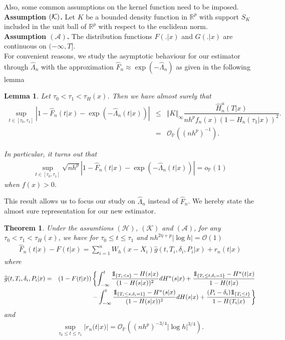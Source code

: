\documentclass[12pt]{article}
\newtheorem{theorem}{Theorem}[section]
\newtheorem{lemma}{Lemma}[section]
\def\ind{ {{\rm 1}\hskip-2.2pt{\rm l}}}
\begin{document}
Also, some common assumptions on the kernel function need to be imposed.\\

\noindent
{\bf Assumption $({\cal K})$.} Let $K$ be a bounded density function in $\mathbb R^p$ with support $S_K$ included in the unit ball of $\mathbb{R}^p$ with respect to the euclidean norm.\\ 

\noindent
{\bf Assumption $(\mathcal{A})$.} The distribution functions $F(.|x)$ and $G(.|x)$ are continuous on $(-\infty,T]$.\\

For convenient reasons, we study the asymptotic behaviour for our estimator through $\widehat{\Lambda}_n$ with the approximation $\widehat{F}_n\approx\exp(-\widehat{\Lambda}_n)$ as given in the following lemma

\begin{lemma}
\label{lambda}
Let $\tau_0<\tau_1<\tau_H(x)$. Then we have almost surely that
\begin{eqnarray*}
\sup_{t\in[\tau_0,\tau_1]}\left|1-\widehat{F}_n(t|x)-\exp(-\widehat{\Lambda}_n(t|x))\right|&\leq&\Vert K\Vert_\infty \dfrac{\widehat{H}_n^u(T|x)}{nh^pf_n(x)(1-H_n(\tau_1|x))^2}.\\
&=&\mathcal{O}_\mathbb{P}((nh^p)^{-1}).
\end{eqnarray*}

In particular, it turns out that
\begin{eqnarray*}
\sup_{t\in[\tau_0,\tau_1]}\sqrt{nh^p}\left|1-\widehat{F}_n(t|x)-\exp(-\widehat{\Lambda}_n(t|x))\right|=o_\mathbb{P}(1)
\end{eqnarray*}  
when $f(x)>0$. 
\end{lemma}

This result allows us to focus our study on $\widehat{\Lambda}_n$ instead of $\widehat{F}_n$. We hereby state the almost sure representation for our new estimator.

\begin{theorem}\label{asrep}
Under the assumtions $(\mathcal{H})$, $(\mathcal{K})$ and $(\mathcal{A})$, for any $\tau_0<\tau_1<\tau_H(x)$, we have for $\tau_0\leq t\leq \tau_1$ and $nh^{2\eta+p}|\log h|=\mathcal{O}(1)$
\begin{eqnarray*}
\widehat{F}_n(t|x)-F(t|x)=\sum_{i=1}^nW_h(x-X_i)\widehat{g}(t,T_i,\delta_i,P_i|x)+r_n(t|x)
\end{eqnarray*}
where
\begin{eqnarray*}
\widehat{g}(t,T_i,\delta_i,P_i|x)&=&(1-F(t|x)) \left\{\int_{-\infty}^t\dfrac{\ind_{\{T_i < s\}}-H(s|x)}{(1-H(s|x))^2}dH^u(s|x)+\dfrac{\ind_{\{T_i \leq t,\delta_i=1\}}-H^u(t|x)}{1-H(t|x)}\right.\\
&&\left.-\int_{-\infty}^t\dfrac{\ind_{\{T_i \leq s,\delta_i=1\}}-H^u(s|x)}{(1-H(s|x))^2}dH(s|x)+\dfrac{(P_i-\delta_i)\ind_{\{T_i\leq t\}}}{1-H(T_i|x)}\right\}
\end{eqnarray*}
and
\begin{eqnarray*}
\sup_{\tau_0\leq t\leq \tau_1}|r_n(t|x)|=\mathcal{O}_\mathbb{P}((nh^p)^{-3/4} |\log h|^{3/4}).
\end{eqnarray*}
\end{theorem}
\end{document}
